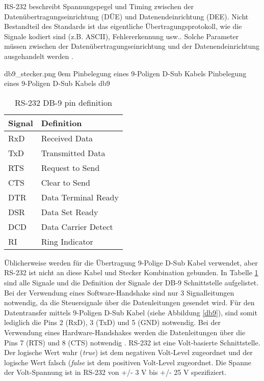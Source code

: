RS-232 beschreibt Spannungspegel und Timing zwischen der Datenübertragungseinrichtung (DÜE) und Datenendeinrichtung (DEE). Nicht Bestandteil des Standards ist das eigentliche Übertragungsprotokoll, wie die Signale kodiert sind (z.B. ASCII), Fehlererkennung usw.. Solche Parameter müssen zwischen der Datenübertragungseinrichtung und der Datenendeinrichtung ausgehandelt werden \cite{wasistrs232}.

{db9_stecker.png}
{0em}
{Pinbelegung eines 9-Poligen D-Sub Kabels}
{Pinbelegung eines 9-Poligen D-Sub Kabels \cite[S. 222]{hughes2010real}}
{db9}

\begin{table}[h]
\caption{RS-232 DB-9 pin definition \cite[S. 223]{hughes2010real}}
\begin{center}

\begin{tabularx}{1\textwidth}{XX}
\hline
Signal & Definition \\
\hline
RxD & Received Data \\
TxD & Transmitted Data\\
RTS & Request to Send \\
CTS & Clear to Send \\
DTR & Data Terminal Ready \\
DSR & Data Set Ready \\
DCD & Data Carrier Detect \\
RI & Ring Indicator \\
\hline
\end{tabularx}
\end{center}
\label{db8pindef}
\end{table}

Üblicherweise werden für die Übertragung 9-Polige D-Sub Kabel verwendet, aber RS-232 ist nicht an diese Kabel und Stecker Kombination gebunden. In Tabelle \ref{db8pindef} sind alle Signale und die Definition der Signale der DB-9 Schnittstelle aufgelistet. Bei der Verwendung eines Software-Handshake sind nur 3 Signalleitungen notwendig, da die Steuersignale über die Datenleitungen gesendet wird. Für den Datentransfer mittels 9-Poligen D-Sub Kabel (siehe Abbildung \ref{db9}), sind somit lediglich die Pins 2 (RxD), 3 (TxD) und 5 (GND) notwendig. Bei der Verwendung eines Hardware-Handshakes werden die Datenleitungen über die Pins 7 (RTS) und 8 (CTS) notwendig \cite{db9}. RS-232 ist eine Volt-basierte Schnittstelle. Der logische Wert wahr (\textit{true}) ist dem negativen Volt-Level zugeordnet und der logische Wert falsch (\textit{false} ist dem positiven Volt-Level zugeordnet. Die Spanne der Volt-Spannung ist in RS-232 von +/- 3 V bis +/- 25 V spezifiziert.


